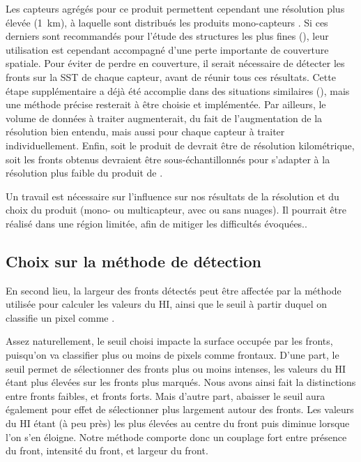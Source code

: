 Les capteurs agrégés pour ce produit permettent cependant une résolution plus élevée (\qty{1}{\km}), à laquelle sont distribués les produits mono-capteurs .
Si ces derniers sont recommandés pour l'étude des structures les plus fines (\cite{merchant_2019}), leur utilisation est cependant accompagné d'une perte importante de couverture spatiale.
Pour éviter de perdre en couverture, il serait nécessaire de détecter les fronts sur la SST de chaque capteur, avant de réunir tous ces résultats.
Cette étape supplémentaire a déjà été accomplie dans des situations similaires (\cite{miller_2009,nieto_2012}), mais une méthode précise resterait à être choisie et implémentée.
Par ailleurs, le volume de données à traiter augmenterait, du fait de l'augmentation de la résolution bien entendu, mais aussi pour chaque capteur à traiter individuellement.
Enfin, soit le produit de  devrait être de résolution kilométrique, soit les fronts obtenus devraient être sous-échantillonnés pour s'adapter à la résolution plus faible du produit de .

Un travail est nécessaire sur l'influence sur nos résultats de la résolution et du choix du produit (mono- ou multicapteur, avec ou sans nuages).
Il pourrait être réalisé dans une région limitée, afin de mitiger les difficultés évoquées..

\subsection{Choix sur la méthode de détection}

En second lieu, la largeur des fronts détectés peut être affectée par la méthode utilisée pour calculer les valeurs du HI, ainsi que le seuil à partir duquel on classifie un pixel comme .

Assez naturellement, le seuil choisi impacte la surface occupée par les fronts, puisqu'on va classifier plus ou moins de pixels comme frontaux.
D'une part, le seuil permet de sélectionner des fronts plus ou moins intenses, les valeurs du HI étant plus élevées sur les fronts plus marqués.
Nous avons ainsi fait la distinctions entre fronts faibles, et fronts forts.
Mais d'autre part, abaisser le seuil aura également pour effet de sélectionner plus largement autour des fronts.
Les valeurs du HI étant (à peu près) les plus élevées au centre du front puis diminue lorsque l'on s'en éloigne.
Notre méthode comporte donc un couplage fort entre présence du front, intensité du front, et largeur du front.

